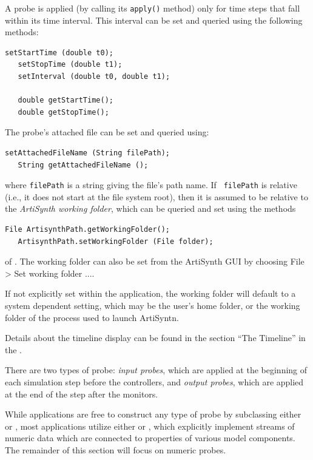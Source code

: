 A probe is applied (by calling its {\tt apply()} method) only for time
steps that fall within its time interval. This interval can be set and
queried using the following methods:
\begin{lstlisting}[]
   setStartTime (double t0);
   setStopTime (double t1);
   setInterval (double t0, double t1);
 
   double getStartTime();
   double getStopTime();
\end{lstlisting}
%
The probe's attached file can be set and queried using:
\begin{lstlisting}[]
   setAttachedFileName (String filePath);
   String getAttachedFileName ();
\end{lstlisting}
%
where {\tt filePath} is a string giving the file's path name.  If {\tt
filePath} is relative (i.e., it does not start at the file system root), then
it is assumed to be relative to the {\it ArtiSynth working folder}, which
can be queried and set using the methods
%
\begin{lstlisting}[]
   File ArtisynthPath.getWorkingFolder();
   ArtisynthPath.setWorkingFolder (File folder);
\end{lstlisting}
%
of .
The working folder can also be set from the ArtiSynth GUI
by choosing {\sf File > Set working folder ...}.
\begin{sideblock}
If not explicitly set within the application, the working folder will default
to a system dependent setting, which may be the user's home folder, or the
working folder of the process used to launch ArtiSyntn.
\end{sideblock}

Details about the timeline display can be found in
the section ``The Timeline'' in the
.

There are two types of probe: {\it input probes}, which are applied at
the beginning of each simulation step before the controllers, and {\it
output probes}, which are applied at the end of the step after the
monitors.

While applications are free to construct any type of probe by
subclassing either  or
, most applications
utilize either  or
, which
explicitly implement streams of numeric data which are connected to
properties of various model components.  The remainder of this section
will focus on numeric probes.

